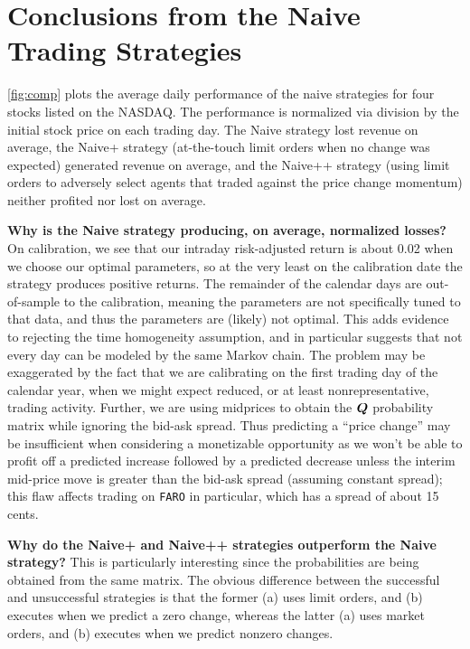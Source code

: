 \section{Conclusions from the Naive Trading Strategies}

\autoref{fig:comp} plots the average daily performance of the naive strategies for four stocks listed on the NASDAQ. The performance is normalized via division by the initial stock price on each trading day. The Naive strategy lost revenue on average, the Naive+ strategy (at-the-touch limit orders when no change was expected) generated revenue on average, and the Naive++ strategy (using limit orders to adversely select agents that traded against the price change momentum) neither profited nor lost on average.

{\bf Why is the Naive strategy producing, on average, normalized losses?} On calibration, we see that our intraday risk-adjusted return is about 0.02 when we choose our optimal parameters, so at the very least on the calibration date the strategy produces positive returns. The remainder of the calendar days are out-of-sample to the calibration, meaning the parameters are not specifically tuned to that data, and thus the parameters are (likely) not optimal. This adds evidence to rejecting the time homogeneity assumption, and in particular suggests that not every day can be modeled by the same Markov chain. The problem may be exaggerated by the fact that we are calibrating on the first trading day of the calendar year, when we might expect reduced, or at least nonrepresentative, trading activity. Further, we are using midprices to obtain the $\boldsymbol{Q}$ probability matrix while ignoring the bid-ask spread. Thus predicting a ``price change'' may be insufficient when considering a monetizable opportunity as we won't be able to profit off a predicted increase followed by a predicted decrease unless the interim mid-price move is greater than the bid-ask spread (assuming constant spread); this flaw affects trading on \texttt{FARO} in particular, which has a spread of about 15 cents.

{\bf Why do the Naive+ and Naive++ strategies outperform the Naive strategy?} This is particularly interesting since the probabilities are being obtained from the same matrix. The obvious difference between the successful and unsuccessful strategies is that the former (a) uses limit orders, and (b) executes when we predict a zero change, whereas the latter (a) uses market orders, and (b) executes when we predict nonzero changes.


